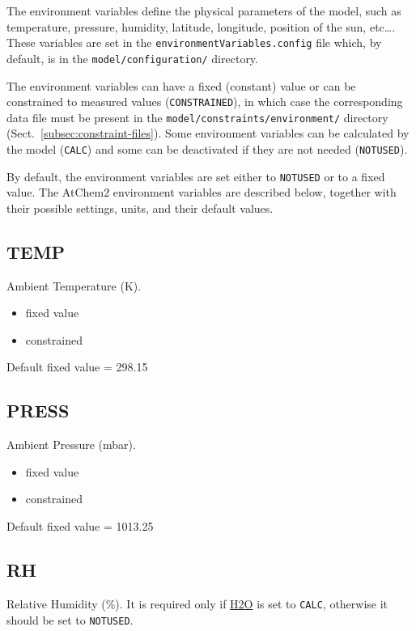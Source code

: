 The environment variables define the physical parameters of the model,
such as temperature, pressure, humidity, latitude, longitude, position
of the sun, etc\ldots. These variables are set in the
\texttt{environmentVariables.config} file which, by default, is in the
\texttt{model/configuration/} directory.

The environment variables can have a fixed (constant) value or can be
constrained to measured values (\texttt{CONSTRAINED}), in which case
the corresponding data file must be present in the
\texttt{model/constraints/environment/} directory
(Sect.~\ref{subsec:constraint-files}). Some environment variables can
be calculated by the model (\texttt{CALC}) and some can be deactivated
if they are not needed (\texttt{NOTUSED}).

By default, the environment variables are set either to \texttt{NOTUSED} or
to a fixed value. The AtChem2 environment variables are described
below, together with their possible settings, units, and their default
values.

\subsection{TEMP} \label{subsec:temp}

Ambient Temperature (K).

\begin{itemize}
\item fixed value
\item constrained
\end{itemize}

Default fixed value = 298.15

\subsection{PRESS} \label{subsec:press}

Ambient Pressure (mbar).

\begin{itemize}
\item fixed value
\item constrained
\end{itemize}

Default fixed value = 1013.25

\subsection{RH} \label{subsec:rh}

Relative Humidity (\%). It is required only if
\hyperref[subsec:h2o]{H2O} is set to \texttt{CALC}, otherwise it
should be set to \texttt{NOTUSED}.

